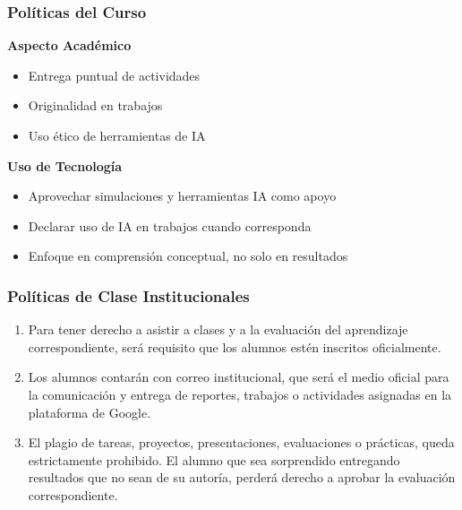 \documentclass{beamer}
\begin{document}
\begin{frame}
    \frametitle{Políticas del Curso}
    
    \textbf{Aspecto Académico}
    \begin{itemize}
        \item Entrega puntual de actividades
        \item Originalidad en trabajos
        \item Uso ético de herramientas de IA
    \end{itemize}
    \vspace{0.3cm}
    
    \textbf{Uso de Tecnología}
    \begin{itemize}
        \item Aprovechar simulaciones y herramientas IA como apoyo
        \item Declarar uso de IA en trabajos cuando corresponda
        \item Enfoque en comprensión conceptual, no solo en resultados
    \end{itemize}
\end{frame}

\begin{frame}
    \frametitle{Políticas de Clase Institucionales}
    \begin{enumerate}
        \item Para tener derecho a asistir a clases y a la evaluación del aprendizaje correspondiente, será requisito que los alumnos estén inscritos oficialmente.
        
        \item Los alumnos contarán con correo institucional, que será el medio oficial para la comunicación y entrega de reportes, trabajos o actividades asignadas en la plataforma de Google.
        
        \item El plagio de tareas, proyectos, presentaciones, evaluaciones o prácticas, queda estrictamente prohibido. El alumno que sea sorprendido entregando resultados que no sean de su autoría, perderá derecho a aprobar la evaluación correspondiente.
    \end{enumerate}
\end{frame}
\end{document}
